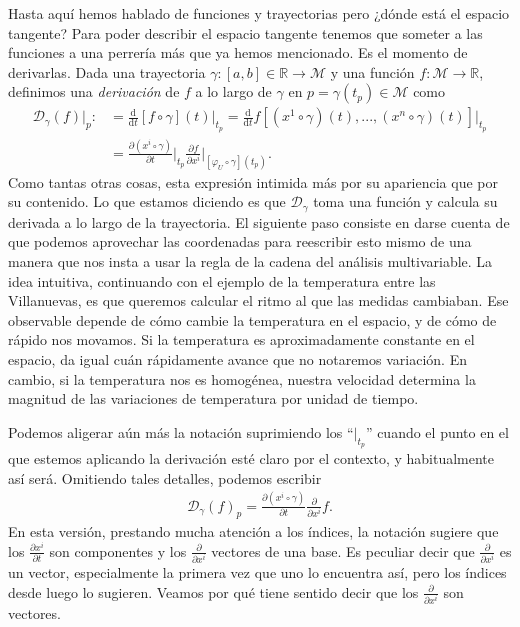 Hasta aquí hemos hablado de funciones y trayectorias pero ¿dónde está el espacio tangente? Para poder describir el espacio tangente tenemos que someter a las funciones a una perrería más que ya hemos mencionado. Es el momento de derivarlas. Dada una trayectoria \(\gamma:[a, b]\in\mathbb{R}\rightarrow\mathcal{M}\) y una función \(f:\mathcal{M}\rightarrow\mathbb{R}\), definimos una \emph{derivación} de \(f\) a lo largo de \(\gamma\) en \(p=\gamma(t_p)\in\mathcal{M}\) como 
\begin{align}
    \nonumber
    \mathcal{D}_\gamma(f)\big|_{p} :&= \frac{\mathrm{d}}{\mathrm{d}t}[f\circ \gamma](t)\big|_{t_p} 
    = \frac{\mathrm{d}}{\mathrm{d}t} f\left[\left(x^1\circ\gamma\right)(t), ..., \left(x^n\circ\gamma\right)(t)\right]\big|_{t_p} \\
    & = 
    \frac{\partial \left(x^i\circ\gamma\right)}{\partial t}\Big|_{t_p}\frac{\partial f}{\partial x^i}\Big|_{[\varphi_U\circ\gamma](t_p)}.
\end{align}
Como tantas otras cosas, esta expresión intimida más por su apariencia que por su contenido. Lo que estamos diciendo es que \(\mathcal{D}_\gamma\) toma una función y calcula su derivada a lo largo de la trayectoria. El siguiente paso consiste en darse cuenta de que podemos aprovechar las coordenadas para reescribir esto mismo de una manera que nos insta a usar la regla de la cadena del análisis multivariable. La idea intuitiva, continuando con el ejemplo de la temperatura entre las Villanuevas, es que queremos calcular el ritmo al que las medidas cambiaban. Ese observable depende de cómo cambie la temperatura en el espacio, y de cómo de rápido nos movamos. Si la temperatura es aproximadamente constante en el espacio, da igual cuán rápidamente avance que no notaremos variación. En cambio, si la temperatura nos es homogénea, nuestra velocidad determina la magnitud de las variaciones de temperatura por unidad de tiempo.

Podemos aligerar aún más la notación suprimiendo los ``\(|_{t_p}\)'' cuando el punto en el que estemos aplicando la derivación esté claro por el contexto, y habitualmente así será. Omitiendo tales detalles, podemos escribir
\begin{align}
    \mathcal{D}_\gamma(f)_p = \frac{\partial \left(x^i\circ\gamma\right)}{\partial t}\frac{\partial }{\partial x^i} f.
\end{align}
En esta versión, prestando mucha atención a los índices, la notación sugiere que los \(\frac{\partial x^i}{\partial t}\) son componentes y los \(\frac{\partial }{\partial x^i}\) vectores de una base. Es peculiar decir que \(\frac{\partial }{\partial x^i}\) es un vector, especialmente la primera vez que uno lo encuentra así, pero los índices desde luego lo sugieren. Veamos por qué tiene sentido decir que los \(\frac{\partial }{\partial x^i}\) son vectores. 

